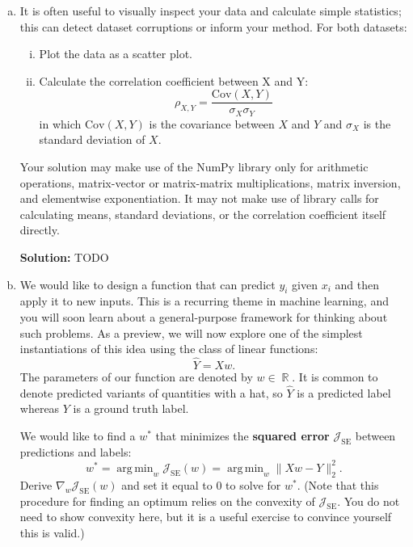 \documentclass{article}
\DeclareMathOperator{\R}{\mathbb{R}}
\DeclareMathOperator*{\argmin}{arg\,min}
\newenvironment{solution}{\color{blue} \smallskip \textbf{Solution:}}{}
\begin{document}
\begin{enumerate}[(a)]

    \item 
    It is often useful to visually inspect your data and calculate simple statistics; this can detect dataset corruptions or inform your method. 
    For both datasets:
    \begin{enumerate}[(i)]
        \item Plot the data as a scatter plot.
        \item 
        Calculate the correlation coefficient between X and Y:
        \[
            \rho_{X,Y} = \frac{\text{Cov}(X, Y)}{\sigma_X \sigma_Y}
        \]
        in which $\text{Cov}(X, Y)$ is the covariance between $X$ and $Y$ and $\sigma_X$ is the standard deviation of $X$.
    \end{enumerate}
    Your solution may make use of the NumPy library only for arithmetic operations, matrix-vector or matrix-matrix multiplications, matrix inversion, and elementwise exponentiation. 
    It may not make use of library calls for calculating means, standard deviations, or the correlation coefficient itself directly.

    \begin{solution}
        TODO
    \end{solution}

    \item
    We would like to design a function that can predict $y_i$ given $x_i$ and then apply it to new inputs. 
    This is a recurring theme in machine learning, and you will soon learn about a general-purpose framework for thinking about such problems. 
    As a preview, we will now explore one of the simplest instantiations of this idea using the class of linear functions:
    \begin{equation}
    \label{eq:y_hat}
        \hat{Y} = X w.
    \end{equation}
    The parameters of our function are denoted by $w \in \R$. 
    It is common to denote predicted variants of quantities with a hat, so $\hat{Y}$ is a predicted label whereas $Y$ is a ground truth label.
    
    We would like to find a $w^*$ that minimizes the \textbf{squared error} $\mathcal{J}_\text{SE}$ between predictions and labels:
    \[
        w^* = \argmin_{w} \mathcal{J}_\text{SE}(w) = \argmin_w \| Xw - Y \|_2^2.
    \]
    Derive $\nabla_w \mathcal{J}_\text{SE}(w)$ and set it equal to 0 to solve for $w^*$. 
    (Note that this procedure for finding an optimum relies on the convexity of $\mathcal{J}_\text{SE}$. You do not need to show convexity here, but it is a useful exercise to convince yourself this is valid.)


\end{enumerate}
\end{document}
